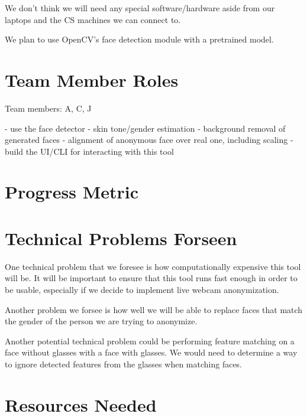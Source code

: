 We don't think we will need any special software/hardware aside from our laptops and the CS machines we can connect to.

We plan to use OpenCV's face detection module with a pretrained model.

\section*{Team Member Roles}


Team members: A, C, J

- use the face detector
- skin tone/gender estimation
- background removal of generated faces
- alignment of anonymous face over real one, including scaling
- build the UI/CLI for interacting with this tool

\section*{Progress Metric}


\section*{Technical Problems Forseen}

One technical problem that we foresee is how computationally expensive this tool will be. It will be important to ensure that this tool runs fast enough in order to be usable, especially if we decide to implement live webcam anonymization.

Another problem we forsee is how well we will be able to replace faces that match the gender of the person we are trying to anonymize.

Another potential technical problem could be performing feature matching on a face without glasses with a face with glasses. We would need to determine a way to ignore detected features from the glasses when matching faces.

\section*{Resources Needed}


